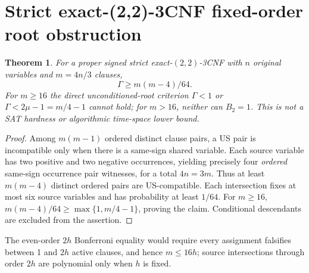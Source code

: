 \documentclass[10pt]{article}
\newtheorem{theorem}{Theorem}
\begin{document}
\section{Strict exact-(2,2)-3CNF fixed-order root obstruction}
\begin{theorem}
For a proper signed strict exact-$(2,2)$-3CNF with $n$ original variables and $m=4n/3$ clauses,
\[
\Gamma\ge m(m-4)/64.
\]
For $m\ge16$ the direct unconditioned-root criterion $\Gamma<1$ or $\Gamma<2\mu-1=m/4-1$ cannot hold; for $m>16$, neither can $B_2=1$. This is \emph{not} a SAT hardness or algorithmic time-space lower bound.
\end{theorem}
\begin{proof}
Among $m(m-1)$ ordered distinct clause pairs, a US pair is incompatible only when there is a same-sign shared variable. Each source variable has two positive and two negative occurrences, yielding precisely four \emph{ordered} same-sign occurrence pair witnesses, for a total $4n=3m$. Thus at least $m(m-4)$ distinct ordered pairs are US-compatible. Each intersection fixes at most six source variables and has probability at least $1/64$. For $m\ge16$, $m(m-4)/64\ge\max\{1,m/4-1\}$, proving the claim. Conditional descendants are excluded from the assertion.
\end{proof}
The even-order $2h$ Bonferroni equality would require every assignment falsifies between 1 and $2h$ active clauses, and hence $m\le16h$; source intersections through order $2h$ are polynomial only when $h$ is fixed.
\end{document}
